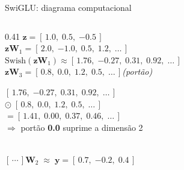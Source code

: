 \documentclass[aspectratio=169,xcolor=dvipsnames]{beamer}
\begin{document}
\begin{frame}{SwiGLU: diagrama computacional}
\begin{columns}[T]
\begin{column}{0.41\textwidth}
        {\setlength{\fboxsep}{3pt}%
        \colorbox{CellBlue}{$\mathbf{z} = [\,1.0,\;0.5,\;{-0.5}\,]$}\\[0.35em]
        \colorbox{CellYellow}{$\mathbf{z}\mathbf{W}_1 = [\,2.0,\;{-1.0},\;0.5,\;1.2,\;\ldots\,]$}\\[0.15em]
        \colorbox{CellRed}{$\mathrm{Swish}(\mathbf{z}\mathbf{W}_1) \approx [\,1.76,\;{-0.27},\;0.31,\;0.92,\;\ldots\,]$}\\[0.45em]
        \colorbox{CellGreen}{$\mathbf{z}\mathbf{W}_3 = [\,0.8,\;\mathbf{0.0},\;1.2,\;0.5,\;\ldots\,]$\;\textit{(portão)}}\\[0.6em]
        }%

        \colorbox{PastelOrange}{%
          \begin{minipage}{0.88\linewidth}
            \scriptsize
            $[\,1.76,\;{-0.27},\;0.31,\;0.92,\;\ldots\,]$\\
            $\odot\;[\,0.8,\;\mathbf{0.0},\;1.2,\;0.5,\;\ldots\,]$\\[0.15em]
            $=[\,1.41,\;\mathbf{0.00},\;0.37,\;0.46,\;\ldots\,]$\\[0.2em]
            \textcolor{red!70!black}{\tiny$\Rightarrow$ portão \textbf{0.0} suprime a dimensão 2}
          \end{minipage}%
        }\\[0.6em]

        {\setlength{\fboxsep}{3pt}%
        \colorbox{CellYellow}{$[\,\cdots\,]\mathbf{W}_2\;\approx\;\mathbf{y} = [\,0.7,\;{-0.2},\;0.4\,]$}
        }
      \end{column}
    \end{columns}
  \end{frame}
\end{document}
